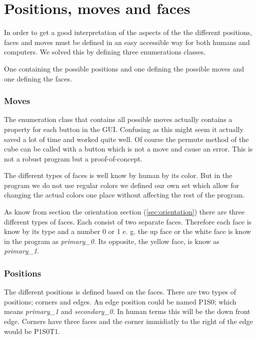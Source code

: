 \section{Positions, moves and faces}
In order to get a good interpretation of the aspects of the \cube{} the different positions, faces and moves must be defined in an easy accessible way for both humans and computers. We solved this by defining three enumerations classes. 

One containing the possible positions and one defining the possible moves and one defining the faces.

\subsubsection{Moves}
The enumeration class that contains all possible moves actually contains a property for each button in the GUI. Confusing as this might seem it actually saved a lot of time and worked quite well. Of course the permute method of the cube can be called with a button which is not a move and cause an error. This is not a robust program but a proof-of-concept. 

The different types of faces is well know by human by its color. But in the program we do not use regular colors we defined our own set which allow for changing the actual colors one place without affecting the rest of the program. 

As know from section the orientation section (\ref{sec:orientation}) there are three different types of faces. Each consist of two separate faces. Therefore each face is know by its type and a number 0 or 1 e. g. the up face or the white face is know in the program as \textit{primary\_0}. Its opposite, the yellow face, is know as \textit{primary\_1}. 

\subsubsection{Positions}
The different positions is defined based on the faces. There are two types of positions; corners and edges. An edge position could be named P1S0; which means \textit{primary\_1} and \textit{secondary\_0}. In human terms this will be the down front edge. Corners have three faces and the corner immidiatly to the right of the edge would be P1S0T1.  
